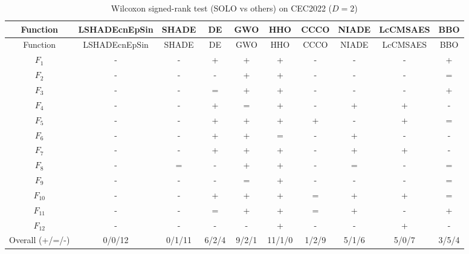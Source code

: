 \begin{center}
\small
\renewcommand{\arraystretch}{1.25}
\begin{longtable}{cccccccccc}
\caption{Wilcoxon signed-rank test (SOLO vs others) on CEC2022 ($D=2$) }
\label{tab:wilcoxon_CEC2022_2} \\
\toprule
Function & LSHADEcnEpSin & SHADE & DE & GWO & HHO & CCCO & NIADE & LcCMSAES & BBO \\
\midrule
\endfirsthead
\toprule
Function & LSHADEcnEpSin & SHADE & DE & GWO & HHO & CCCO & NIADE & LcCMSAES & BBO \\
\midrule
\endhead
$F_{1}$ & - & - & + & + & + & - & - & - & + \\
$F_{2}$ & - & - & - & + & + & - & - & - & = \\
$F_{3}$ & - & - & = & + & + & - & - & - & + \\
$F_{4}$ & - & - & + & = & + & - & + & + & - \\
$F_{5}$ & - & - & + & + & + & + & - & + & = \\
$F_{6}$ & - & - & + & + & = & - & + & - & - \\
$F_{7}$ & - & - & + & + & + & - & + & + & - \\
$F_{8}$ & - & = & - & + & + & - & = & - & = \\
$F_{9}$ & - & - & - & = & + & - & - & - & = \\
$F_{10}$ & - & - & + & + & + & = & + & + & = \\
$F_{11}$ & - & - & = & + & + & = & + & - & + \\
$F_{12}$ & - & - & - & - & + & - & - & + & - \\
\midrule
Overall (+/=/-) & 0/0/12 & 0/1/11 & 6/2/4 & 9/2/1 & 11/1/0 & 1/2/9 & 5/1/6 & 5/0/7 & 3/5/4 \\
\bottomrule
\end{longtable}
\end{center}